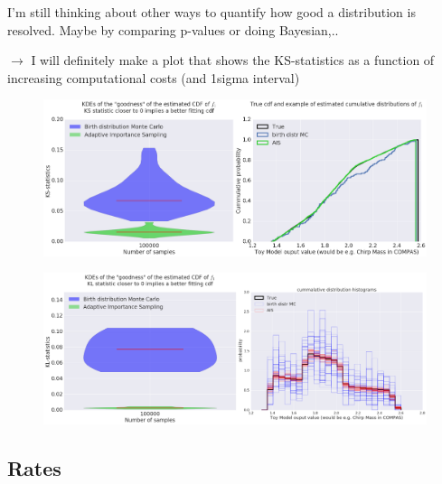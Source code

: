 \documentclass[a4paper,fleqn,usenatbib]{mnras}
\begin{document}
I'm still thinking about other ways to quantify how good a distribution is resolved. Maybe by comparing p-values or doing Bayesian,..






$\rightarrow$
 I will definitely make a plot that shows the KS-statistics as a function of increasing computational costs (and 1sigma interval) 
\begin{figure}[h]
	{\includegraphics[width=1\linewidth]{images/CDF_KStest_combined_f1}}
\caption{}\label{fig:ToyModel-KStests}
\end{figure}


\begin{figure}[h]
	{\includegraphics[width=1\linewidth]{images/Combined_KLviolin_andPDFs-toymodel}}
\caption{}\label{fig:ToyModel-KLtests}
\end{figure}



\subsection{Rates}
\end{document}
